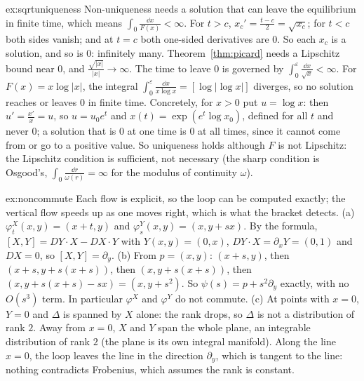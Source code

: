 \begin{solution}{ex:sqrtuniqueness}
\idea Non-uniqueness needs a solution that can leave the equilibrium in finite time, which means $\int_0\frac{\dd x}{F(x)}<\infty$.
\writeup For $t>c$, $x_c'=\frac{t-c}2=\sqrt{x_c}$; for $t<c$ both sides vanish; and at $t=c$ both one-sided derivatives are $0$. So each $x_c$ is a solution, and
so is $0$: infinitely many. Theorem~\ref{thm:picard} needs a Lipschitz bound near $0$, and $\frac{\sqrt{|x|}}{|x|}\to\infty$. The time to leave $0$ is governed by
$\int_0^\varepsilon\frac{\dd x}{\sqrt x}<\infty$. For $F(x)=x\log|x|$, the integral $\int_0^\varepsilon\frac{\dd x}{x\log x}=[\log|\log x|]$ diverges, so no solution reaches or leaves $0$
in finite time. Concretely, for $x>0$ put $u=\log x$: then $u'=\frac{x'}x=u$, so $u=u_0e^t$ and $x(t)=\exp(e^t\log x_0)$, defined for all $t$ and never $0$; a solution
that is $0$ at one time is $0$ at all times, since it cannot come from or go to a positive value. So uniqueness holds although $F$ is not Lipschitz:
the Lipschitz condition is sufficient, not necessary (the sharp condition is Osgood's, $\int_0\frac{\dd r}{\omega(r)}=\infty$ for the modulus of continuity $\omega$).
\end{solution}

\begin{solution}{ex:noncommute}
\idea Each flow is explicit, so the loop can be computed exactly; the vertical flow speeds up as one moves right, which is what the bracket detects.
\writeup (a) $\varphi^X_t(x,y)=(x+t,y)$ and $\varphi^Y_s(x,y)=(x,y+sx)$. By the formula, $[X,Y]=DY\cdot X-DX\cdot Y$ with $Y(x,y)=(0,x)$, $DY\cdot X=\partial_xY=(0,1)$ and
$DX=0$, so $[X,Y]=\partial_y$. (b) From $p=(x,y)$: $(x+s,y)$, then $(x+s,y+s(x+s))$, then $(x,y+s(x+s))$, then $(x,y+s(x+s)-sx)=(x,y+s^2)$. So
$\psi(s)=p+s^2\partial_y$ exactly, with no $O(s^3)$ term. In particular $\varphi^X$ and $\varphi^Y$ do not commute. (c) At points with $x=0$, $Y=0$ and $\Delta$ is
spanned by $X$ alone: the rank drops, so $\Delta$ is not a distribution of rank $2$. Away from $x=0$, $X$ and $Y$ span the whole plane, an integrable
distribution of rank $2$ (the plane is its own integral manifold). Along the line $x=0$, the loop leaves the line in the direction $\partial_y$, which
is tangent to the line: nothing contradicts Frobenius, which assumes the rank is constant.
\end{solution}

